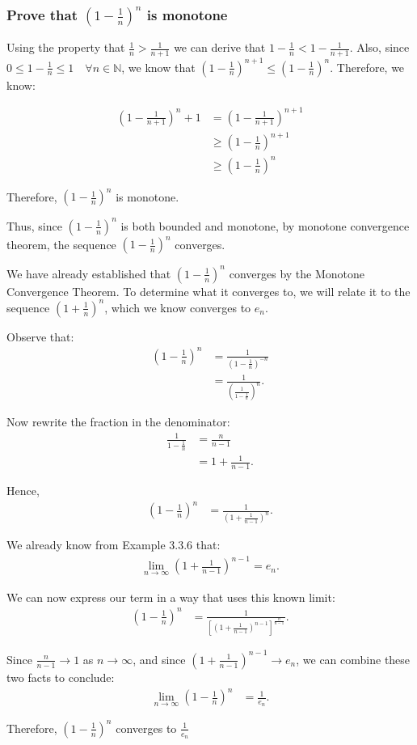 \documentclass{article}
\begin{document}
\subsubsection{Prove that $(1 - \frac{1}{n})^n$ is monotone}

Using the property that $\frac{1}{n} > \frac{1}{n + 1}$ we can derive that $1 - \frac{1}{n} < 1 - \frac{1}{n + 1}$. Also, since $0 \le 1 - \frac{1}{n} \le 1 \quad \forall n \in \mathbb{N}$, we know that $(1 - \frac{1}{n})^{n + 1} \le (1 - \frac{1}{n})^n$. Therefore, we know:

\begin{align*}
	(1 - \frac{1}{n+1})^n+1 &= (1 - \frac{1}{n + 1})^{n + 1} \\
	&\ge (1 - \frac{1}{n})^{n+1} \\
	&\ge (1 - \frac{1}{n})^n
\end{align*}

Therefore, $(1 - \frac{1}{n})^n$ is monotone.

Thus, since $(1 - \frac{1}{n})^n$ is both bounded and monotone, by monotone convergence theorem, the sequence $(1 - \frac{1}{n})^n$ converges.

We have already established that $(1 - \frac{1}{n})^n$ converges by the Monotone Convergence Theorem. To determine what it converges to, we will relate it to the sequence $(1 + \frac{1}{n})^n$, which we know converges to $e_n$.

Observe that:
\begin{align*}
	(1 - \tfrac{1}{n})^n &= \frac{1}{(1 - \tfrac{1}{n})^{-n}} \\
	&= \frac{1}{\left(\frac{1}{1 - \tfrac{1}{n}}\right)^n}.
\end{align*}

Now rewrite the fraction in the denominator:
\begin{align*}
	\frac{1}{1 - \tfrac{1}{n}} &= \frac{n}{n - 1} \\
	&= 1 + \frac{1}{n - 1}.
\end{align*}

Hence,
\begin{align*}
	(1 - \tfrac{1}{n})^n &= \frac{1}{\left(1 + \tfrac{1}{n - 1}\right)^n}.
\end{align*}

We already know from Example 3.3.6 that:
\begin{align*}
	\lim_{n \to \infty} \left(1 + \tfrac{1}{n - 1}\right)^{n - 1} = e_n.
\end{align*}

We can now express our term in a way that uses this known limit:
\begin{align*}
	(1 - \tfrac{1}{n})^n &= \frac{1}{\left[\left(1 + \tfrac{1}{n - 1}\right)^{n - 1}\right]^{\tfrac{n}{n - 1}}}.
\end{align*}

Since $\tfrac{n}{n - 1} \to 1$ as $n \to \infty$, and since $\left(1 + \tfrac{1}{n - 1}\right)^{n - 1} \to e_n$, we can combine these two facts to conclude:
\begin{align*}
	\lim_{n \to \infty} (1 - \tfrac{1}{n})^n &= \frac{1}{e_n}.
\end{align*}

Therefore, $(1 - \tfrac{1}{n})^n$ converges to $\frac{1}{e_n}$
\end{document}
